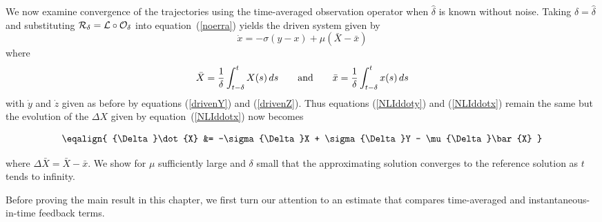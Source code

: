 \documentclass[master,tocprelim,12pt]{unrthesis}
\theoremstyle{definition}
\newcommand{\cO}{{\mathcal O}}
\newcommand{\cL}{{\mathcal L}}
\newcommand{\yourdelta}{{\Delta}}
\def\wwords#1{\qquad\hbox{#1}\qquad}
\numberwithin{equation}{chapter}
\begin{document}
\begin{manuscript}
We now examine convergence of the trajectories using the 
time-averaged observation operator when $\hat\delta$
is known without noise.  Taking $\delta=\hat\delta$
and substituting ${\cal R}_\delta=\cL\circ\cO_\delta$ into
equation~(\ref{noerra}) yields the driven system given by
$$
    \dot{x} = -\sigma(y-x)+\mu (\bar X-\bar x)
$$
where
$$
	\bar X =
{1\over\delta}\int_{t-\delta}^t X(s)\, ds
\wwords{and}
	\bar x =
{1\over\delta}\int_{t-\delta}^t x(s)\, ds
$$
with $\dot y$ and $\dot z$ given as before by equations (\ref{drivenY})
and (\ref{drivenZ}).
Thus equations (\ref{NLIddoty}) and (\ref{NLIddotx}) remain the same but
the evolution of the $\Delta X$ given by equation~(\ref{NLIddotx}) now becomes
\begin{plain}\begin{equation}\label{NLTAdxo}\eqalign{
    \yourdelta\dot{X} &= -\sigma \yourdelta X + \sigma\yourdelta Y 
		- \mu \yourdelta\bar{X}
}\end{equation}\end{plain}%
where $\yourdelta\bar X=\bar X-\bar x$.
We show for $\mu$ sufficiently large and $\delta$ small that 
the approximating solution
converges to the
reference solution as $t$ tends to infinity.

Before proving the main result in this chapter, we first turn our
attention to an estimate that compares time-averaged
and instantaneous-in-time feedback terms.


\end{manuscript}
\end{document}
